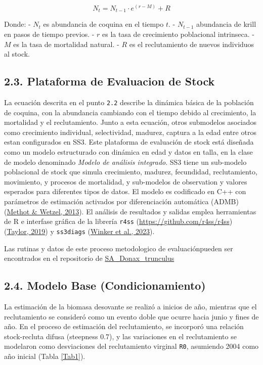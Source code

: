 \documentclass[
]{article}
\begin{document}
\[
N_t = N_{t-1} \cdot e^{(r - M)} + R
\]

Donde:
- \(N_t\) es abundancia de coquina en el tiempo \(t\).
- \(N_{t-1}\) abundancia de krill en pasos de tiempo previos.
- \(r\) es la tasa de crecimiento poblacional intrinseca.
- \(M\) es la tasa de mortalidad natural.
- \(R\) es el reclutamiento de nuevos individuos al stock.

\hypertarget{plataforma-de-evaluacion-de-stock}{%
\subsection{2.3. Plataforma de Evaluacion de Stock}\label{plataforma-de-evaluacion-de-stock}}

La ecuación descrita en el punto \texttt{2.2} describe la dinámica básica de la población de coquina, con la abundancia cambiando con el tiempo debido al crecimiento, la mortalidad y el reclutamiento. Junto a esta ecuación, otros submodelos asociados como crecimiento individual, selectividad, madurez, captura a la edad entre otros estan configurados en SS3. Este plataforma de evaluación de stock está diseñada como un modelo estructurado con dinámica en edad y datos en talla, en la clase de modelo denominado \emph{Modelo de análisis integrado}. SS3 tiene un sub-modelo poblacional de stock que simula crecimiento, madurez, fecundidad, reclutamiento, movimiento, y procesos de mortalidad, y sub-modelos de observation y valores esperados para diferentes tipos de datos. El modelo es codificado en C++ con parámetros de estimación activados por diferenciación automática (ADMB) (\protect\hyperlink{ref-Methot2013}{Methot \& Wetzel, 2013}). El análisis de resultados y salidas emplea herramientas de R e interfase gráfica de la librería \texttt{r4ss} (\url{https://github.com/r4ss/r4ss}) (\protect\hyperlink{ref-Taylor2019}{Taylor, 2019}) y \texttt{ss3diags} (\protect\hyperlink{ref-Henning2023}{Winker et al., 2023}).

Las rutinas y datos de este proceso metodologico de evaluaciónpueden ser encontrados en el repositorio de \href{https://github.com/MauroMardones/SA_Donax_trunculus}{SA\_Donax\_trunculus}

\hypertarget{modelo-base-condicionamiento}{%
\subsection{2.4. Modelo Base (Condicionamiento)}\label{modelo-base-condicionamiento}}

La estimación de la biomasa desovante se realizó a inicios de año, mientras que el reclutamiento se consideró como un evento doble que ocurre hacia junio y fines de año. En el proceso de estimación del reclutamiento, se incorporó una relación stock-recluta difusa (steepness 0.7), y las variaciones en el reclutamiento se modelaron como desviaciones del reclutamiento virginal \texttt{R0}, asumiendo 2004 como año inicial (Tabla \ref{Tab1}).
\end{document}
